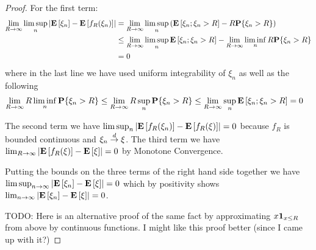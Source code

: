 \begin{proof}
For the first term:
\begin{align*}
\lim_{R \to \infty} \limsup_n \left \vert \textbf{E}\left[\xi_n\right] -
  \textbf{E}\left[f_R(\xi_n)\right] \right \vert 
&= \lim_{R \to \infty} \limsup_n \left ( 
\textbf{E}\left[\xi_n ; \xi_n > R\right] - R\textbf{P}\{\xi_n > R\} \right) \\
&\leq \lim_{R \to \infty} \limsup_n \textbf{E}\left[\xi_n ; \xi_n > R\right] -
\lim_{R \to \infty} \liminf_n R\textbf{P}\{\xi_n > R\}  \\
&= 0
\end{align*}
where in the last line we have used uniform integrability of $\xi_n$
as well as the following
\begin{align*}
\lim_{R \to \infty} R \liminf_n \textbf{P}\{\xi_n > R\} &\leq \lim_{R \to \infty} R \sup_n \textbf{P}\{\xi_n > R\}  \leq \lim_{R \to \infty} \sup_n \textbf{E}\left[\xi_n ; \xi_n > R\right] = 0
\end{align*}

The second term we have $\limsup_n \left \vert \textbf{E}\left[f_R(\xi_n)\right] -
  \textbf{E}\left[f_R(\xi)\right] \right \vert  = 0$ because $f_R$ is bounded continuous
and $\xi_n \overset{d}\to \xi$.  The third term we have $\lim_{R \to \infty}
\left \vert \textbf{E}\left[f_R(\xi)\right] - \textbf{E}\left[\xi\right] \right \vert = 0$ by Monotone
Convergence.

Putting the bounds on the three terms of the right hand side together
we have $\limsup_{n \to \infty} \left \vert \textbf{E}\left[\xi_n\right] -
  \textbf{E}\left[\xi\right] \right \vert = 0$ which by positivity shows $\lim_{n \to \infty} \left \vert \textbf{E}\left[\xi_n\right] -
  \textbf{E}\left[\xi\right] \right \vert = 0$.

TODO:  Here is an alternative proof of the same fact by approximating $x
\textbf{1}_{x \leq R}$ from above by continuous functions.  I
might like this proof better (since I came up with it?)


\end{proof}
